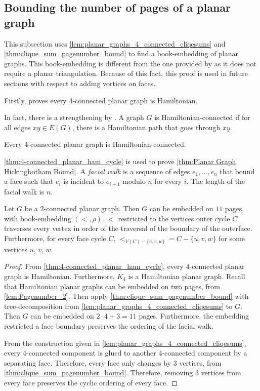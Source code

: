 \subsection{Bounding the number of pages of a planar graph}
This subsection uses \cref{lem:planar_graphs_4_connected_cliqesums} and \cref{thm:clique_sum_pagenumber_bound} to find a book-embedding of planar graphs. This book-embedding is different from the one provided by \textcite{yannakakisEmbeddingPlanarGraphs1989} as it does not require a planar triangulation. Because of this fact, this proof is used in future sections with respect to adding vortices on faces. 

Firstly, \textcite{tutteTheoremPlanarGraphs1956} proves every $4$-connected planar graph is Hamiltonian.

In fact, there is a strengthening by \textcite{thomassenTheoremPathsPlanar1983}. A graph $G$ is Hamiltonian-connected if for all edges $xy \in E(G)$, there is a Hamiltonian path that goes through $xy$. 

\begin{theorem}\label{thm:4-connected_planar_ham_cycle}
	Every 4-connected planar graph is Hamiltonian-connected.
\end{theorem}


\cref{thm:4-connected_planar_ham_cycle} is used to prove \cref{thm:Planar Graph Hickingbotham Bound}. A \textit{facial walk} is a sequence of edges \(e_1, \ldots, e_n\) that bound a face such that \(e_i\) is incident to \(e_{i + 1}\) modulo \(n\) for every \(i\). The length of the facial walk is \(n\).


\begin{corollary}\label{thm:Planar Graph Hickingbotham Bound}
	Let \(G\) be a 2-connected planar graph. Then $G$ can be embedded on $11$ pages, with book-embedding $(<, \rho)$. $<$ restricted to the vertices outer cycle $C$ traverses every vertex in order of the traversal of the boundary of the outerface. Furthermore, for every face cycle $C$, $<_{V(C) - \{u, v, w\}} = C - \{u, v, w\}$ for some vertices $u$, $v$, $w$. 
\end{corollary}
\begin{proof}
	From \cref{thm:4-connected_planar_ham_cycle}, every $4$-connected planar graph is Hamiltonian. Furthermore, $K_4$ is a Hamiltonian planar graph.
	Recall that Hamiltonian planar graphs can be embedded on two pages, from \cref{lem:Pagenumber_2}. 
	Then apply \cref{thm:clique_sum_pagenumber_bound} with tree-decomposition from \cref{lem:planar_graphs_4_connected_cliqesums} to $G$. Then $G$ can be embedded on \(2 \cdot 4 + 3 = 11\) pages. Furthermore, the embedding restricted a face boundary preserves the ordering of the facial walk.

	From the construction given in \cref{lem:planar_graphs_4_connected_cliqesums}, every $4$-connected component is glued to another $4$-connected component by a separating face. Therefore, every face only changes by $3$ vertices, from \cref{thm:clique_sum_pagenumber_bound}. Therefore, removing $3$ vertices from every face preserves the cyclic ordering of every face.
\end{proof}

